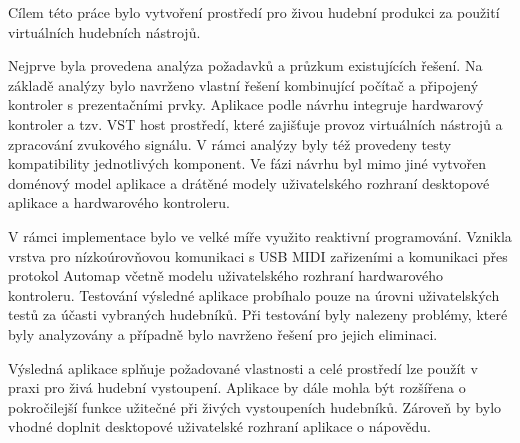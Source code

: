 \documentclass[thesis=M,czech]{FITthesis}[2019/03/06]
\begin{document}
\begin{conclusion}
	Cílem této práce bylo vytvoření prostředí pro živou hudební produkci za použití virtuálních hudebních nástrojů.
	
	Nejprve byla provedena analýza požadavků a průzkum existujících řešení. Na základě analýzy bylo navrženo
	vlastní řešení kombinující počítač a připojený kontroler s prezentačními prvky. Aplikace podle návrhu integruje hardwarový kontroler a tzv. VST host prostředí, které zajišťuje provoz virtuálních nástrojů a zpracování zvukového signálu. V rámci analýzy byly též provedeny testy kompatibility jednotlivých komponent. Ve fázi návrhu byl mimo jiné vytvořen doménový model aplikace a drátěné modely uživatelského rozhraní desktopové aplikace a hardwarového kontroleru.
	
	V rámci implementace bylo ve velké míře využito reaktivní programování. Vznikla vrstva pro nízkoúrovňovou komunikaci s USB MIDI zařizeními a komunikaci přes protokol Automap včetně modelu uživatelského rozhraní hardwarového kontroleru.
	Testování výsledné aplikace probíhalo pouze na úrovni uživatelských testů za účasti vybraných hudebníků. Při testování byly nalezeny problémy, které byly analyzovány a případně bylo navrženo řešení pro jejich eliminaci.
	
	Výsledná aplikace splňuje požadované vlastnosti a celé prostředí lze použít v praxi pro živá hudební vystoupení. Aplikace by dále mohla být rozšířena o pokročilejší funkce užitečné při živých vystoupeních hudebníků. Zároveň by bylo vhodné doplnit desktopové uživatelské rozhraní aplikace o nápovědu.
\end{conclusion}




\appendix
\end{document}
